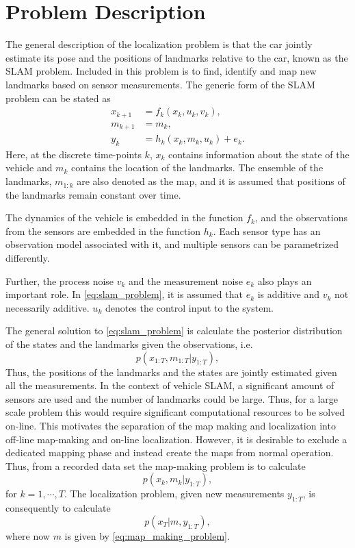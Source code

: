\section{Problem Description}


The general description of the localization problem is that the car
jointly estimate its pose and the positions of landmarks relative to
the car, known as the \gls{SLAM} problem. Included in this problem is
to find, identify and map new landmarks based on sensor
measurements. The generic form of the \gls{SLAM} problem can be stated
as
\begin{subequations}\label{eq:slam_problem}
  \begin{align}
    x_{k+1} & = f_k(x_k, u_k,v_k), \\
    m_{k+1} & = m_k, \\
    y_k & = h_k(x_k, m_k, u_k) + e_k.
  \end{align}
\end{subequations}
Here, at the discrete time-points $k$, $x_k$ contains information about
the state of the vehicle and $m_k$ contains the location of the
landmarks. The ensemble of the landmarks, $m_{1:k}$ are also denoted as the map,
and it is assumed that positions of the landmarks remain constant over
time.

The dynamics of the vehicle is embedded in the function $f_k$, and the observations from the sensors are embedded in the function $h_k$. Each sensor type has an observation model associated with it, and multiple sensors can be parametrized differently. 

Further, the process noise $v_k$ and the measurement noise $e_k$ also plays an important role. In \eqref{eq:slam_problem}, it is assumed that $e_k$ is additive and $v_k$ not necessarily additive. $u_k$ denotes the control input to the system.

The general solution to \eqref{eq:slam_problem} is calculate the posterior distribution of the states and the landmarks given the observations, i.e.
\begin{equation}\label{eq:posterior}
p(x_{1:T}, m_{1:T} | y_{1:T}),
\end{equation}
Thus, the positions of the landmarks and the states are jointly
estimated given all the measurements. In the context of vehicle \gls{SLAM}, a significant amount of sensors are used and the number of landmarks could be large. Thus, for a large scale problem this would require significant computational resources to be solved on-line. This motivates the separation of the map making and
localization into off-line map-making and on-line localization. However, it is desirable to exclude a dedicated mapping phase and instead create the maps from normal operation. Thus, from a recorded data set the map-making problem is to calculate
\begin{equation}\label{eq:map_making_problem}
p(x_{k}, m_{k} | y_{1:T}),
\end{equation}
for $k = 1, \cdots, T$. The localization problem, given new measurements $y_{1:T}$, is consequently to calculate 
$$
p(x_{T}| m ,  y_{1:T}),
$$
where now $m$ is given by \eqref{eq:map_making_problem}.


